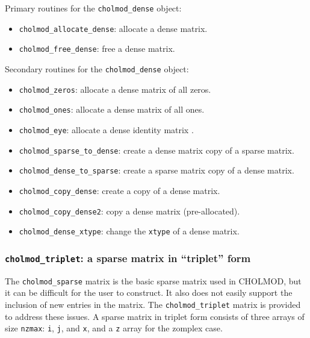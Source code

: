\documentclass[11pt]{article}
\begin{document}
\vspace{0.1in}
\noindent Primary routines for the {\tt cholmod\_dense} object:
    \begin{itemize}
    \item {\tt cholmod\_allocate\_dense}: allocate a dense matrix.
    \item {\tt cholmod\_free\_dense}: free a dense matrix.
    \end{itemize}

\vspace{0.1in}
\noindent Secondary routines for the {\tt cholmod\_dense} object:
    \begin{itemize}
    \item {\tt cholmod\_zeros}: allocate a dense matrix of all zeros.
    \item {\tt cholmod\_ones}: allocate a dense matrix of all ones.
    \item {\tt cholmod\_eye}: allocate a dense identity matrix .
    \item {\tt cholmod\_sparse\_to\_dense}: create a dense matrix copy of a sparse matrix.
    \item {\tt cholmod\_dense\_to\_sparse}: create a sparse matrix copy of a dense matrix.
    \item {\tt cholmod\_copy\_dense}: create a copy of a dense matrix.
    \item {\tt cholmod\_copy\_dense2}: copy a dense matrix (pre-allocated).
    \item {\tt cholmod\_dense\_xtype}: change the {\tt xtype} of a dense matrix.
    \end{itemize}

\newpage \subsubsection{{\tt cholmod\_triplet}: a sparse matrix in ``triplet'' form}
    The {\tt cholmod\_sparse} matrix is the basic sparse matrix used in
    CHOLMOD, but it can be difficult for the user to construct.  It also
    does not easily support the inclusion of new entries in the matrix.
    The {\tt cholmod\_triplet} matrix is provided to address these issues.
    A sparse matrix in triplet form consists of three arrays of size
    {\tt nzmax}: {\tt i}, {\tt j}, and {\tt x}, and a {\tt z} array
    for the zomplex case.
\end{document}
